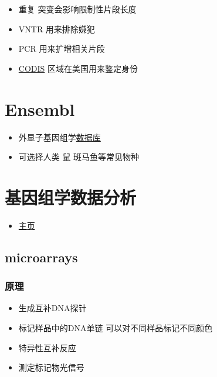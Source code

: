 \documentclass[
]{book}
\providecommand{\tightlist}{%
  \setlength{\itemsep}{0pt}\setlength{\parskip}{0pt}}
\begin{document}
\begin{itemize}
\tightlist
\item
  重复 突变会影响限制性片段长度
\item
  VNTR 用来排除嫌犯
\item
  PCR 用来扩增相关片段
\item
  \href{http://www.fbi.gov/about-us/lab/biometric-analysis/codis}{CODIS} 区域在美国用来鉴定身份
\end{itemize}

\hypertarget{ensembl}{%
\section{Ensembl}\label{ensembl}}

\begin{itemize}
\tightlist
\item
  外显子基因组学\href{ensembl.org}{数据库}
\item
  可选择人类 鼠 斑马鱼等常见物种
\end{itemize}

\hypertarget{ux57faux56e0ux7ec4ux5b66ux6570ux636eux5206ux6790}{%
\section{基因组学数据分析}\label{ux57faux56e0ux7ec4ux5b66ux6570ux636eux5206ux6790}}

\begin{itemize}
\tightlist
\item
  \href{http://genomicsclass.github.io/book/}{主页}
\end{itemize}

\hypertarget{microarrays}{%
\subsection{microarrays}\label{microarrays}}

\hypertarget{ux539fux7406}{%
\subsubsection{原理}\label{ux539fux7406}}

\begin{itemize}
\tightlist
\item
  生成互补DNA探针
\item
  标记样品中的DNA单链 可以对不同样品标记不同颜色
\item
  特异性互补反应
\item
  测定标记物光信号
\end{itemize}
\end{document}
